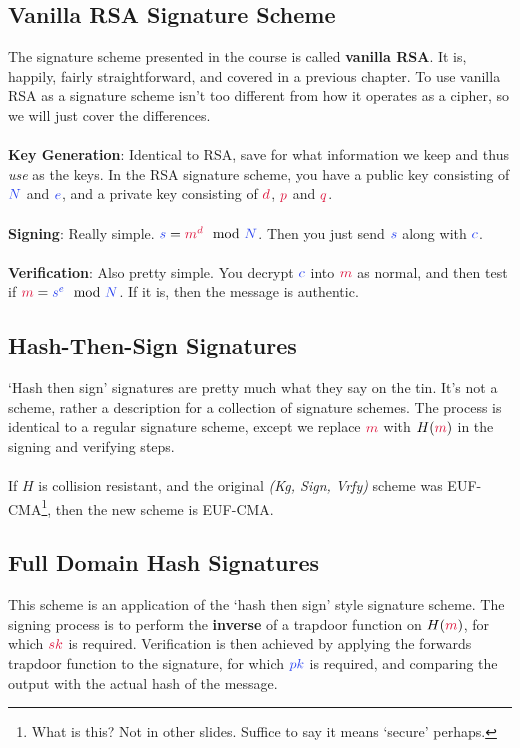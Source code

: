 	\subsection{Vanilla RSA Signature Scheme}
	The signature scheme presented in the course is called \textbf{vanilla RSA}. It is, happily, fairly straightforward, and covered in a previous chapter. To use vanilla RSA as a signature scheme isn't too different from how it operates as a cipher, so we will just cover the differences.\\
	\\
	\textbf{Key Generation}:
	Identical to RSA, save for what information we keep and thus \textit{use} as the keys. In the RSA signature scheme, you have a public key consisting of $\cN$ and $\ce$, and a private key consisting of $\cd$, $\cp$ and $\cq$.\\
	\\
	\textbf{Signing}:
	Really simple. $\csig = \cm^{\cd}\mod \cN$. Then you just send $\csig$ along with $\cc$.\\
	\\
	\textbf{Verification}:
	Also pretty simple. You decrypt $\cc$ into $\cm$ as normal, and then test if $\cm = \csig^{\ce}\mod \cN$. If it is, then the message is authentic.

	\subsection{Hash-Then-Sign Signatures}
		`Hash then sign' signatures are pretty much what they say on the tin. It's not a scheme, rather a description for a collection of signature schemes. The process is identical to a regular signature scheme, except we replace $\cm$ with $H(\cm)$ in the signing and verifying steps.\\
		\\
		If $H$ is collision resistant, and the original \textit{(Kg, Sign, Vrfy)} scheme was EUF-CMA\footnote{What is this? Not in other slides. Suffice to say it means `secure' perhaps.}, then the new scheme is EUF-CMA.

	\subsection{Full Domain Hash Signatures}
		This scheme is an application of the `hash then sign' style signature scheme. The signing process is to perform the \textbf{inverse} of a trapdoor function on $H(\cm)$, for which $\csk$ is required. Verification is then achieved by applying the forwards trapdoor function to the signature, for which $\cpk$ is required, and comparing the output with the actual hash of the message.

